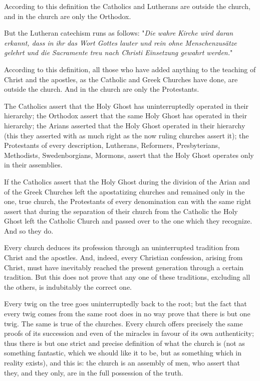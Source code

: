 \documentclass{book}
\begin{document}
According to this definition the Catholics and Lutherans are outside the church, and in the church are only the Orthodox.

But the Lutheran catechism runs as follows: "\emph{Die wahre Kirche wird daran erkannt, dass in ihr das Wort Gottes lauter und rein ohne Menschenzusätze gelehrt und die Sacramente treu nach Christi Einsetzung gewahrt werden.}"

According to this definition, all those who have added anything to the teaching of Christ and the apostles, as the Catholic and Greek Churches have done, are outside the church. And in the church are only the Protestants.

The Catholics assert that the Holy Ghost has uninterruptedly operated in their hierarchy; the Orthodox assert that the same Holy Ghost has operated in their hierarchy; the Arians asserted that the Holy Ghost operated in their hierarchy (this they asserted with as much right as the now ruling churches assert it); the Protestants of every description, Lutherans, Reformers, Presbyterians, Methodists, Swedenborgians, Mormons, assert that the Holy Ghost operates only in their assemblies.

If the Catholics assert that the Holy Ghost during the division of the Arian and of the Greek Churches left the apostatizing churches and remained only in the one, true church, the Protestants of every denomination can with the same right assert that during the separation of their church from the Catholic the Holy Ghost left the Catholic Church and passed over to the one which they recognize. And so they do.

Every church deduces its profession through an uninterrupted tradition from Christ and the apostles. And, indeed, every Christian confession, arising from Christ, must have inevitably reached the present generation through a certain tradition. But this does not prove that any one of these traditions, excluding all the others, is indubitably the correct one.

Every twig on the tree goes uninterruptedly back to the root; but the fact that every twig comes from the same root does in no way prove that there is but one twig. The same is true of the churches. Every church offers precisely the same proofs of its succession and even of the miracles in favour of its own authenticity; thus there is but one strict and precise definition of what the church is (not as something fantastic, which we should like it to be, but as something which in reality exists), and this is: the church is an assembly of men, who assert that they, and they only, are in the full possession of the truth.
\end{document}

